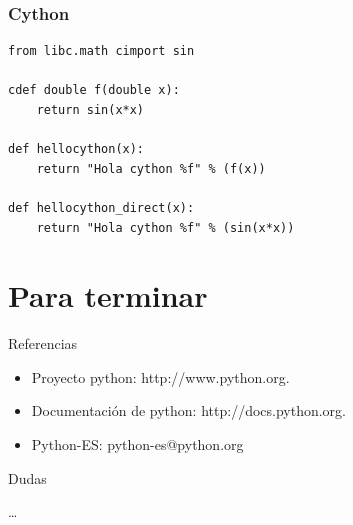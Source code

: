 \documentclass[10pt]{beamer}
\begin{document}
  \begin{frame}[containsverbatim]
    \frametitle{Cython}
    \begin{verbatim}
from libc.math cimport sin

cdef double f(double x):
    return sin(x*x)

def hellocython(x):
    return "Hola cython %f" % (f(x))

def hellocython_direct(x):
    return "Hola cython %f" % (sin(x*x))
    \end{verbatim}
  \end{frame}

  \section{Para terminar}
  
  \begin{frame}{Referencias}
    \begin{itemize}
      \item Proyecto python: http://www.python.org.
      \item Documentación de python: http://docs.python.org.
      \item Python-ES: python-es@python.org
    \end{itemize}
  \end{frame}

  \begin{frame}{Dudas}
    \begin{center}
      \dots
    \end{center}
  \end{frame}
\end{document}
